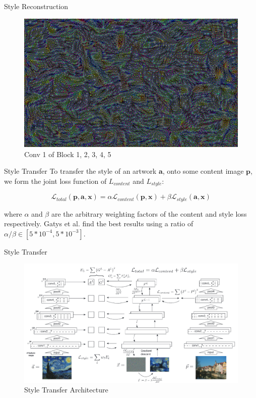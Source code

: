 \documentclass{beamer}
\begin{document}
\begin{frame}{Style Reconstruction}
\begin{figure}[ht]
\centering
\caption{Conv 1 of Block 1, 2, 3, 4, 5}
\includegraphics[width=\textwidth]{img/style/block5_conv1.png}
\end{figure}
\end{frame}

\begin{frame}{Style Transfer}
To transfer the style of an artwork $\textbf{a}$, onto some content image
$\textbf{p}$, we form the joint loss function of $L_{content}$ and
$L_{style}$:

\begin{equation}
    \mathcal{L}_{total}(\mathbf{p}, \mathbf{a}, \mathbf{x}) =
    \alpha \mathcal{L}_{content}(\mathbf{p}, \mathbf{x}) +
    \beta \mathcal{L}_{style}(\mathbf{a}, \mathbf{x})
\end{equation}

where $\alpha$ and $\beta$ are the arbitrary weighting factors of the content
and style loss respectively. Gatys et al. find the best results using a ratio
of $\alpha / \beta \in [5*10^{-4}, 5*10^{-3}]$.

\end{frame}

\begin{frame}{Style Transfer}
\begin{figure}[ht]
\centering
\caption{Style Transfer Architecture}
\includegraphics[width=\textwidth]{img/style-transfer}
\end{figure}
\end{frame}
\end{document}
